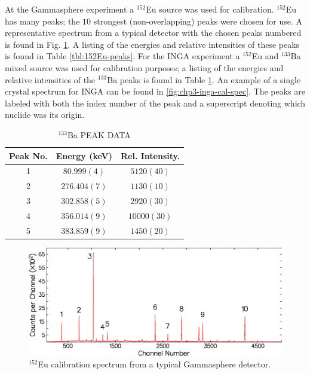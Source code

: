At the Gammasphere experiment a $^{152}$Eu source was used for calibration. $^{152}$Eu has many peaks; the $10$ strongest (non-overlapping) peaks were chosen for use. A representative spectrum from a typical detector with the chosen peaks numbered is found in Fig. \ref{fig:chp3-gs-cal-spec}.  A listing of the energies and relative intensities of these peaks is found in Table \ref{tbl:152Eu-peaks}. For the INGA experiment a $^{152}$Eu and $^{133}$Ba mixed source was used for calibration purposes; a listing of the energies and relative intensities of the $^{133}$Ba peaks is found in Table \ref{tbl:133Ba-peaks}. An example of a single crystal spectrum for INGA can be found in \ref{fig:chp3-inga-cal-spec}. The peaks are labeled with both the index number of the peak and a superscript denoting which nuclide was its origin.

\begin{table}[hb!]
\caption{$^{133}$Ba PEAK DATA \label{tbl:133Ba-peaks}}
\begin{center}
\begin{tabular}{ccc}
\toprule
Peak No. & Energy (keV) & Rel. Intensity. \\ 
\midrule
1 & $80.999(4)$ & $5120(40)$ \\ 
2 & $276.404(7)$ & $1130(10)$ \\ 
3 & $302.858(5)$ & $2920(30)$ \\ 
4 & $356.014(9)$ & $10000(30)$ \\ 
5 & $383.859(9)$ & $1450(20)$ \\ 
\bottomrule
\end{tabular} 
\end{center}
\end{table}

\begin{figure}[h!]
	\setlength{\capwidth}{\textwidth}
	\centerline{\includegraphics[height=0.25\textheight]{./img/c3/gs_cal_spec.eps}}
	\caption{$^{152}$Eu calibration spectrum from a typical Gammasphere detector.\label{fig:chp3-gs-cal-spec}}
	\setlength{\capwidth}{0.9\textwidth}
\end{figure}

